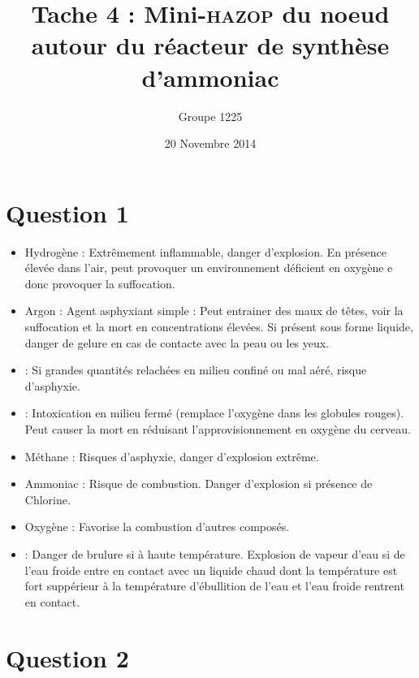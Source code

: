 \documentclass[a4paper,oneside,12pt]{article}
\title{Tache 4 : Mini-\textsc{hazop} du noeud autour du réacteur de synthèse d'ammoniac}
\author{Groupe 1225}
\date{20 Novembre 2014}
\begin{document}
\maketitle

\section*{Question 1}

\begin{itemize}
	\item{Hydrogène} : Extrêmement inflammable, danger d'explosion. 
		En présence élevée dans l'air, peut provoquer un environnement déficient 
		en oxygène e donc provoquer la suffocation. 

	\item{Argon} : Agent asphyxiant simple : Peut entrainer des maux de têtes, 
		voir la suffocation et la mort en concentrations élevées. 
		Si présent sous forme liquide, danger de gelure en cas de contacte 
		avec la peau ou les yeux.

	\item{} : Si grandes quantités relachées en milieu confiné ou mal aéré, 
		risque d'asphyxie.

	\item{} : Intoxication en milieu fermé (remplace l'oxygène dans les 
		globules rouges). Peut causer la mort en réduisant l'approvisionnement 
		en oxygène du cerveau.

	\item{Méthane} : Risques d'asphyxie, danger d'explosion extrême.

	\item{Ammoniac} : Risque de combustion. Danger d'explosion si présence de Chlorine.

	\item{Oxygène} : Favorise la combustion d'autres composés.

	\item{} : Danger de brulure si à haute température. 
		Explosion de vapeur d'eau si de l'eau froide entre en contact avec un 
		liquide chaud dont la température est fort suppérieur à la température 
		d'ébullition de l'eau et l'eau froide rentrent en contact.
\end{itemize}

\section*{Question 2}
\end{document}
